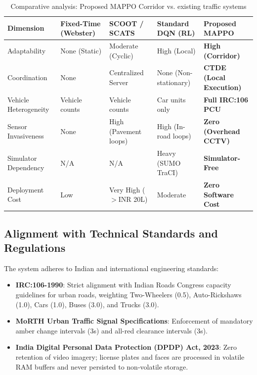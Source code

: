 \begin{table}[htbp]
\centering
\scriptsize
\setlength{\tabcolsep}{3pt}
\caption{Comparative analysis: Proposed MAPPO Corridor vs. existing traffic systems}
\label{tab:ch5_competitive_comparison}
\begin{tabularx}{\textwidth}{|p{2.2cm}|p{2.0cm}|p{2.0cm}|p{2.2cm}|X|}
\hline
\textbf{Dimension} & \textbf{Fixed-Time (Webster)} & \textbf{SCOOT / SCATS} & \textbf{Standard DQN (RL)} & \textbf{Proposed MAPPO} \\ \hline
Adaptability & None (Static) & Moderate (Cyclic) & High (Local) & \textbf{High (Corridor)} \\ \hline
Coordination & None & Centralized Server & None (Non-stationary) & \textbf{CTDE (Local Execution)} \\ \hline
Vehicle Heterogeneity & Vehicle counts & Vehicle counts & Car units only & \textbf{Full IRC:106 PCU} \\ \hline
Sensor Invasiveness & None & High (Pavement loops) & High (In-road loops) & \textbf{Zero (Overhead CCTV)} \\ \hline
Simulator Dependency & N/A & N/A & Heavy (SUMO TraCI) & \textbf{Simulator-Free} \\ \hline
Deployment Cost & Low & Very High ($>$INR 20L) & Moderate & \textbf{Zero Software Cost} \\ \hline
\end{tabularx}
\end{table}

\subsection{Alignment with Technical Standards and Regulations}
The system adheres to Indian and international engineering standards:
\begin{itemize}
    \item \textbf{IRC:106-1990}: Strict alignment with Indian Roads Congress capacity guidelines for urban roads, weighting Two-Wheelers (0.5), Auto-Rickshaws (1.0), Cars (1.0), Buses (3.0), and Trucks (3.0).
    \item \textbf{MoRTH Urban Traffic Signal Specifications}: Enforcement of mandatory amber change intervals (3s) and all-red clearance intervals (3s).
    \item \textbf{India Digital Personal Data Protection (DPDP) Act, 2023}: Zero retention of video imagery; license plates and faces are processed in volatile RAM buffers and never persisted to non-volatile storage.
\end{itemize}

